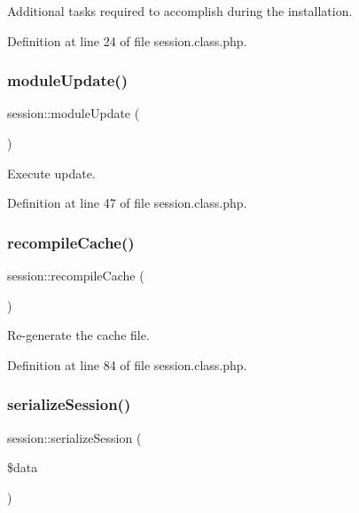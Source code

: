 Additional tasks required to accomplish during the installation. 



Definition at line 24 of file session.\+class.\+php.

\hypertarget{classsession_ad1eb77a85d7765620658071e49d16cff}{}\label{classsession_ad1eb77a85d7765620658071e49d16cff} 
\subsubsection{\texorpdfstring{module\+Update()}{moduleUpdate()}}
{\footnotesize\ttfamily session\+::module\+Update (\begin{DoxyParamCaption}{ }\end{DoxyParamCaption})}



Execute update. 



Definition at line 47 of file session.\+class.\+php.

\hypertarget{classsession_a08f5190f8867dc2c0d5c23435b236f15}{}\label{classsession_a08f5190f8867dc2c0d5c23435b236f15} 
\subsubsection{\texorpdfstring{recompile\+Cache()}{recompileCache()}}
{\footnotesize\ttfamily session\+::recompile\+Cache (\begin{DoxyParamCaption}{ }\end{DoxyParamCaption})}



Re-\/generate the cache file. 



Definition at line 84 of file session.\+class.\+php.

\hypertarget{classsession_aea7dba13f8bc60c916840c66b2bc28ba}{}\label{classsession_aea7dba13f8bc60c916840c66b2bc28ba} 
\subsubsection{\texorpdfstring{serialize\+Session()}{serializeSession()}}
{\footnotesize\ttfamily session\+::serialize\+Session (\begin{DoxyParamCaption}\item[{}]{\$data }\end{DoxyParamCaption})}



